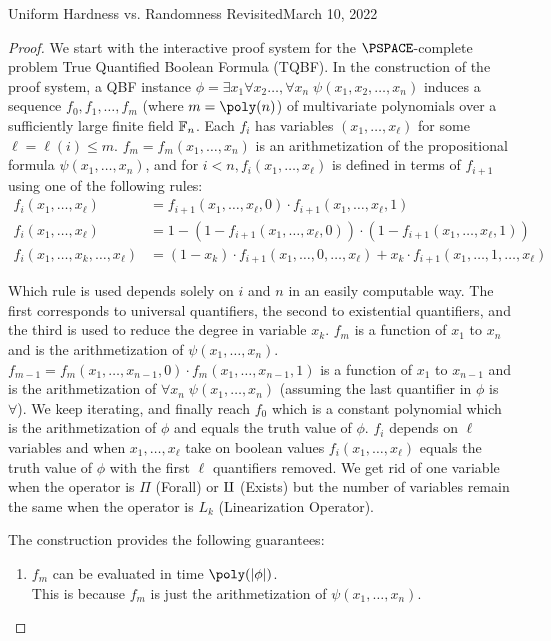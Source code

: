 \begin{lecture}{8}{Uniform Hardness vs. Randomness Revisited}{March 10, 2022}
\begin{proof}
We start with the interactive proof system for the $\PSPACE$-complete problem True Quantified Boolean Formula (TQBF). In the construction of the proof system, a QBF instance 
$\phi = \exists x_1 \forall x_2 \ldots , \forall x_n \; \psi(x_1,x_2, \ldots, x_n)$ induces a sequence $f_0, f_1, \ldots , f_m$ (where $m = \poly(n)$) of multivariate polynomials over a sufficiently large finite field $\mathbb{F}_n$. 
Each $f_i$ has variables $(x_1, \dots, x_{\ell})$ for some $\ell = \ell(i) \leq m$. 
$f_m = f_m(x_1, \ldots , x_n)$ is an arithmetization of the propositional formula $\psi(x_1, \ldots , x_n)$, and for $i < n, f_i( x_1, \ldots , x_{\ell})$ is defined in terms of $f_{i+1}$ using one of the following rules:
\begin{align*}
	f_i(x_1, \ldots, x_{\ell}) &= f_{i+1}(x_1, \ldots, x_{\ell},0) \cdot f_{i+1}(x_1, \ldots, x_{\ell},1) \tag{Forall} \\
	f_i(x_1, \ldots, x_{\ell}) &= 1- ( 1- f_{i+1}(x_1, \ldots, x_{\ell},0) ) \cdot ( 1- f_{i+1}(x_1, \ldots, x_{\ell},1) ) \tag{Exists}	\\
	f_i(x_1, \ldots, x_k, \ldots, x_{\ell}) &= (1-x_k) \cdot f_{i+1}(x_1, \ldots, 0, \ldots, x_{\ell}) + x_k \cdot f_{i+1}(x_1, \ldots, 1, \ldots, x_{\ell}) \tag{Linearization}
\end{align*}

Which rule is used depends solely on $i$ and $n$ in an easily computable way. The first corresponds to universal quantifiers, the second to existential quantifiers, and the third is used to reduce the degree in variable $x_k$.
$f_m$ is a function of $x_1$ to $x_n$ and is the arithmetization of $\psi(x_1, \ldots , x_n)$. $f_{m-1}=f_{m}(x_1, \ldots, x_{n-1},0) \cdot f_{m}(x_1, \ldots, x_{n-1},1)$ is a function of $x_1$ to $x_{n-1}$ and is the arithmetization of $\forall x_n \; \psi(x_1, \ldots , x_n)$ (assuming the last quantifier in $\phi$ is $\forall$). We keep iterating, and finally reach $f_0$ which is a constant polynomial which is the arithmetization of $\phi$ and equals the truth value of $\phi$. $f_i$ depends on $\ell$ variables and when $x_1, \ldots , x_{\ell}$ take on boolean values $f_i(x_1, \ldots , x_{\ell})$ equals the truth value of $\phi$ with the first $\ell$ quantifiers removed.
We get rid of one variable when the operator is $\Pi$ (Forall) or $\antipi$ (Exists) but the number of variables remain the same when the operator is $L_k$ (Linearization Operator).

The construction provides the following guarantees:
\begin{enumerate}
	\item $f_m$ can be evaluated in time $\poly(\card{\phi})$. \\
	This is because $f_m$ is just the arithmetization of $\psi(x_1, \ldots , x_n)$.
	

\end{enumerate}
\end{proof}
\end{lecture}
